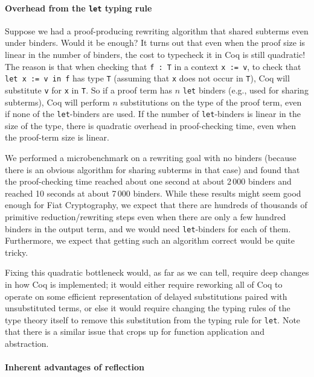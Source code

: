 \paragraph{Overhead from the \texttt{let} typing rule}

Suppose we had a proof-producing rewriting algorithm that shared subterms even under binders.
Would it be enough?
It turns out that even when the proof size is linear in the number of binders, the cost to typecheck it in Coq is still quadratic!
The reason is that when checking that \texttt{f : T} in a context \texttt{x := v}, to check that \texttt{let x := v in f} has type \texttt{T} (assuming that \texttt{x} does not occur in \texttt{T}), Coq will substitute \texttt{v} for \texttt{x} in \texttt{T}.
So if a proof term has $n$ \texttt{let} binders (e.g., used for sharing subterms), Coq will perform $n$ substitutions on the type of the proof term, even if none of the \texttt{let}-binders are used.
If the number of \texttt{let}-binders is linear in the size of the type, there is quadratic overhead in proof-checking time, even when the proof-term size is linear.

We performed a microbenchmark on a rewriting goal with no binders (because there is an obvious algorithm for sharing subterms in that case) and found that the proof-checking time reached about one second at about 2\,000 binders and reached 10 seconds at about 7\,000 binders.
While these results might seem good enough for Fiat Cryptography, we expect that there are hundreds of thousands of primitive reduction/rewriting steps even when there are only a few hundred binders in the output term, and we would need \texttt{let}-binders for each of them.
Furthermore, we expect that getting such an algorithm correct would be quite tricky.

Fixing this quadratic bottleneck would, as far as we can tell, require deep changes in how Coq is implemented; it would either require reworking all of Coq to operate on some efficient representation of delayed substitutions paired with unsubstituted terms, or else it would require changing the typing rules of the type theory itself to remove this substitution from the typing rule for \texttt{let}.
Note that there is a similar issue that crops up for function application and abstraction.

\paragraph{Inherent advantages of reflection}

